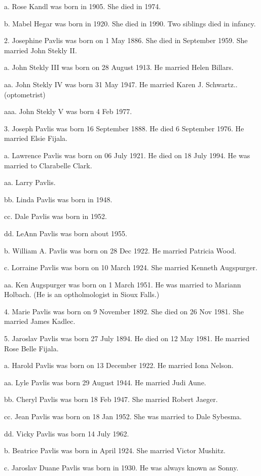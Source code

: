 \documentclass[a4paper]{article}
\begin{document}
a. Rose Kandl was born in 1905.  She died in 1974.  

b. Mabel Hegar was born in 1920.  She died in 1990.  Two siblings died in infancy.

2. Josephine Pavlis was born on 1 May 1886.  She died in September 1959. She married John Stekly II.

a. John Stekly III was born on 28 August 1913.  He married Helen Billars.

aa. John Stekly IV was born 31 May 1947.  He married Karen J. Schwartz..  (optometrist)

aaa. John Stekly V was born 4 Feb 1977.

3. Joseph Pavlis was born 16 September 1888.  He died 6 September 1976.  He married Elsie Fijala.

a. Lawrence Pavlis was born on 06 July 1921.  He died on 18 July 1994. He was married to Clarabelle Clark.

aa. Larry Pavlis.

bb. Linda Pavlis was born in 1948.

cc. Dale Pavlis was born in 1952.

dd. LeAnn Pavlis was born about 1955.

b. William A. Pavlis was born on 28 Dec 1922.  He married Patricia Wood.

c. Lorraine Pavlis was born on 10 March 1924.  She married Kenneth Augspurger.

aa. Ken Augspurger was born on 1 March 1951.  He was married to Mariann Holbach. (He is an optholmologist in Sioux Falls.)

4. Marie Pavlis was born on 9 November 1892.  She died on 26 Nov 1981.  She married James Kadlec.

5. Jaroslav Pavlis was born 27 July 1894.  He died on 12 May 1981.  He married Rose Belle Fijala.  

a.  Harold Pavlis was born on 13 December 1922.  He married Iona Nelson.  

aa. Lyle Pavlis was born 29 August 1944.  He married Judi Aune.

bb. Cheryl Pavlis was born 18 Feb 1947.  She married Robert Jaeger.

cc. Jean Pavlis was born on 18 Jan 1952.  She was married to Dale Sybesma.

dd. Vicky Pavlis was born 14 July 1962.

b. Beatrice Pavlis was born in April 1924.  She married Victor Mushitz.

c. Jaroslav Duane Pavlis was born in 1930.  He was always known as Sonny.
\end{document}
